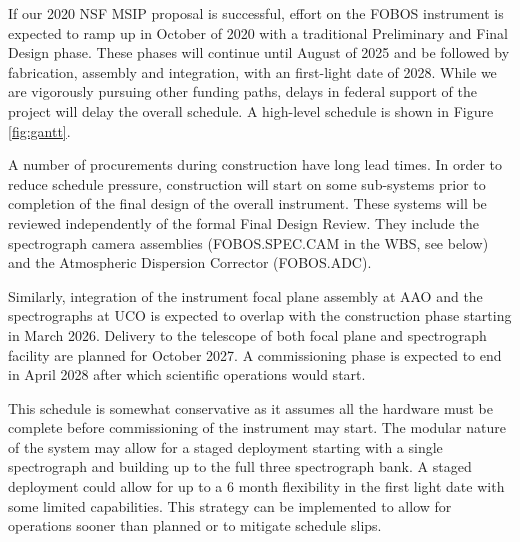 \documentclass[oneside,11pt]{amsart}
\begin{document}
If our 2020 NSF MSIP proposal is successful, effort on the FOBOS instrument is expected to ramp up in October of 2020
with a  traditional Preliminary and Final Design phase.  These phases will continue until August of 2025 and be
followed by fabrication, assembly and integration, with an first-light date of 2028.  While we are vigorously pursuing
other funding paths, delays in federal support of the project will delay the overall schedule.  A high-level schedule is shown in Figure \ref{fig:gantt}.  

A number of procurements during construction have long lead times.  In order to reduce schedule pressure, construction will start on some sub-systems prior to completion of the final design of the overall instrument.  These
systems will be reviewed independently of the formal Final Design Review.  They include the spectrograph camera
assemblies (FOBOS.SPEC.CAM in the WBS, see below) and the Atmospheric Dispersion Corrector (FOBOS.ADC).

Similarly, integration of the instrument focal plane assembly at AAO and the spectrographs at UCO is expected to
overlap with the construction phase starting in March 2026.  Delivery to the telescope of both focal plane and
spectrograph facility are planned for October 2027.  A commissioning phase is expected to end in April 2028 after which
scientific operations would start.

This schedule is somewhat conservative as it assumes all the hardware must be complete before commissioning of the
instrument may start.  The modular nature of the system may allow for a staged deployment starting with a single
spectrograph and building up to the full three spectrograph bank.  A staged deployment could allow for up to a 6 month
flexibility in the first light date with some limited capabilities.  This strategy can be implemented to allow for
operations sooner than planned or to mitigate schedule slips.



\end{document}
